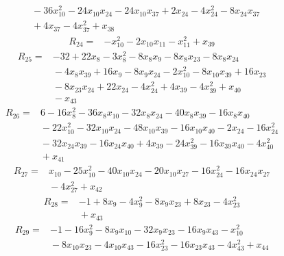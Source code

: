 {\begin{align*}
&{}  - 36x_{10}^{2} - 24x_{10} x_{24} - 24x_{10} x_{37} + 2x_{24} - 4x_{24}^{2} - 8x_{24} x_{37} \\
&{}  + 4x_{37} - 4x_{37}^{2} + x_{38}
\end{align*}
\begin{align*}
R_{24} ={}& -x_{10}^{2} - 2x_{10} x_{11} - x_{11}^{2} + x_{39}
\end{align*}
\begin{align*}
R_{25} ={}& -32 + 22x_{8} - 3x_{8}^{2} - 8x_{8} x_{9} - 8x_{8} x_{23} - 8x_{8} x_{24} \\
&{}  - 4x_{8} x_{39} + 16x_{9} - 8x_{9} x_{24} - 2x_{10}^{2} - 8x_{10} x_{39} + 16x_{23} \\
&{}  - 8x_{23} x_{24} + 22x_{24} - 4x_{24}^{2} + 4x_{39} - 4x_{39}^{2} + x_{40} \\
&{}  - x_{43}
\end{align*}
\begin{align*}
R_{26} ={}& 6 - 16x_{8}^{2} - 36x_{8} x_{10} - 32x_{8} x_{24} - 40x_{8} x_{39} - 16x_{8} x_{40} \\
&{}  - 22x_{10}^{2} - 32x_{10} x_{24} - 48x_{10} x_{39} - 16x_{10} x_{40} - 2x_{24} - 16x_{24}^{2} \\
&{}  - 32x_{24} x_{39} - 16x_{24} x_{40} + 4x_{39} - 24x_{39}^{2} - 16x_{39} x_{40} - 4x_{40}^{2} \\
&{}  + x_{41}
\end{align*}
\begin{align*}
R_{27} ={}& x_{10} - 25x_{10}^{2} - 40x_{10} x_{24} - 20x_{10} x_{27} - 16x_{24}^{2} - 16x_{24} x_{27} \\
&{}  - 4x_{27}^{2} + x_{42}
\end{align*}
\begin{align*}
R_{28} ={}& -1 + 8x_{9} - 4x_{9}^{2} - 8x_{9} x_{23} + 8x_{23} - 4x_{23}^{2} \\
&{}  + x_{43}
\end{align*}
\begin{align*}
R_{29} ={}& -1 - 16x_{9}^{2} - 8x_{9} x_{10} - 32x_{9} x_{23} - 16x_{9} x_{43} - x_{10}^{2} \\
&{}  - 8x_{10} x_{23} - 4x_{10} x_{43} - 16x_{23}^{2} - 16x_{23} x_{43} - 4x_{43}^{2} + x_{44}
\end{align*}
\begin{align*}

\end{align*}}
